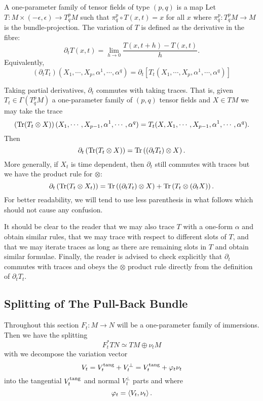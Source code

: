 \begin{defn}
A one-parameter family of tensor fields of type \((p, q)\) is a map
Let \(T : M \times (-\epsilon, \epsilon) \to T^p_q M\) such that \(\pi^p_q \circ T(x, t) = x\) for all \(x\) where \(\pi^p_q : T^p_q M \to M\) is the bundle-projection. The variation of \(T\) is defined as the derivative in the fibre:
\[
\partial_t T (x, t) = \lim_{h\to 0} \frac{T(x, t + h) - T(x, t)}{h}.
\]
Equivalently,
\[
(\partial_t T_t) (X_1, \cdots, X_p, \alpha^1, \cdots, \alpha^q) = \partial_t \left[T_t (X_1, \cdots, X_p, \alpha^1, \cdots, \alpha^q)\right]
\]
\end{defn}

\begin{rem}
Taking partial derivatives, \(\partial_t\) commutes with taking traces. That is, given \(T_t \in \Gamma(T^p_q M)\) a one-parameter family of \((p,q)\) tensor fields and \(X \in TM\) we may take the trace
\[
\left(\operatorname{Tr} (T_t \otimes X)\right) (X_1, \cdots, X_{p-1}, \alpha^1, \cdots, \alpha^q) = T_t(X, X_1, \cdots, X_{p-1}, \alpha^1, \cdots, \alpha^q).
\]
Then
\[
\partial_t \left(\operatorname{Tr} (T_t \otimes X)\right) = \operatorname{Tr} \left((\partial_t T_t) \otimes X\right).
\]
More generally, if \(X_t\) is time dependent, then \(\partial_t\) still commutes with traces but we have the product rule for \(\otimes\):
\[
\partial_t \left(\operatorname{Tr} (T_t \otimes X_t)\right) = \operatorname{Tr} \left((\partial_t T_t) \otimes X\right) + \operatorname{Tr} \left(T_t \otimes (\partial_t X)\right).
\]
For better readability, we will tend to use less parenthesis in what follows which should not cause any confusion.

It should be clear to the reader that we may also trace \(T\) with a one-form \(\alpha\) and obtain similar rules, that we may trace with respect to different slots of \(T\), and that we may iterate traces as long as there are remaining slots in \(T\) and obtain similar formulae. Finally, the reader is advised to check explicitly that \(\partial_t\) commutes with traces and obeys the \(\otimes\) product rule directly from the definition of \(\partial_t T_t\).
\end{rem}

\subsection*{Splitting of The Pull-Back Bundle}

Throughout this section \(F_t : M \to N\) will be a one-parameter family of immersions. Then we have the splitting
\[
F_t^{\ast} TN \simeq TM \oplus \nu_t M
\]
with we decompose the variation vector
\[
V_t = V^{\operatorname{tang}}_t + V^{\perp}_t = V^{\operatorname{tang}}_t + \varphi_t \nu_t
\]
into the tangential \(V^{\operatorname{tang}}_t\) and normal \(V^{\perp}_t\) parts and where
\[
\varphi_t = \left\langle V_t,\nu_t \right\rangle.
\]

